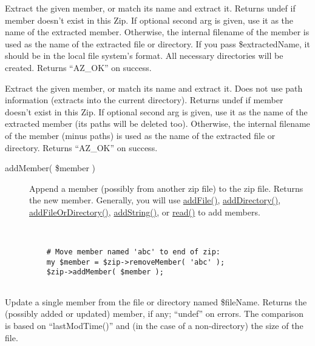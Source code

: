 \documentclass[]{article}
\renewcommand{\emph}[1]{\underline{#1}}
\begin{document}
\begin{description}
\itemsep1pt\parskip0pt
\item[extractMember( \$memberOrName {[}, \$extractedName {]} )]
Extract the given member, or match its name and extract it. Returns
undef if member doesn't exist in this Zip. If optional second arg is
given, use it as the name of the extracted member. Otherwise, the
internal filename of the member is used as the name of the extracted
file or directory. If you pass \$extractedName, it should be in the
local file system's format. All necessary directories will be created.
Returns ``AZ\_OK'' on success.
\end{description}

\begin{description}
\itemsep1pt\parskip0pt
\item[extractMemberWithoutPaths( \$memberOrName {[}, \$extractedName {]}
)]
Extract the given member, or match its name and extract it. Does not use
path information (extracts into the current directory). Returns undef if
member doesn't exist in this Zip. If optional second arg is given, use
it as the name of the extracted member (its paths will be deleted too).
Otherwise, the internal filename of the member (minus paths) is used as
the name of the extracted file or directory. Returns ``AZ\_OK'' on
success.
\end{description}

\begin{description}
\item[addMember( \$member )]
Append a member (possibly from another zip file) to the zip file.
Returns the new member. Generally, you will use \emph{addFile()},
\emph{addDirectory()}, \emph{addFileOrDirectory()}, \emph{addString()},
or \emph{read()} to add members.

~

\begin{verbatim}
    # Move member named 'abc' to end of zip:
    my $member = $zip->removeMember( 'abc' );
    $zip->addMember( $member );
    
\end{verbatim}
\end{description}

\begin{description}
\itemsep1pt\parskip0pt
\item[updateMember( \$memberOrName, \$fileName )]
Update a single member from the file or directory named \$fileName.
Returns the (possibly added or updated) member, if any; ``undef'' on
errors. The comparison is based on ``lastModTime()'' and (in the case of
a non-directory) the size of the file.
\end{description}
\end{document}
